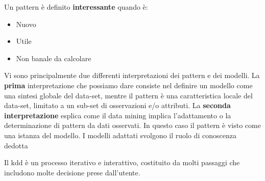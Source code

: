\documentclass[a4paper]{extarticle}
\begin{document}
Un pattern è definito \textbf{interessante} quando è:
\begin{itemize}
	\item Nuovo
	\item Utile
	\item Non banale da calcolare
\end{itemize}

Vi sono principalmente due differenti interpretazioni dei pattern e dei modelli.
La \textbf{prima} interpretazione che possiamo dare consiste nel definire un modello come una sintesi globale del data-set, mentre il pattern è una caratteristica locale del data-set, limitato a un sub-set di osservazioni e/o attributi.
La \textbf{seconda interpretazione} esplica come il data mining implica l'adattamento o la determinazione di pattern da dati osservati. In questo caso il pattern è visto come una istanza del modello. I modelli adattati svolgono il ruolo di conoscenza dedotta

Il kdd è un processo iterativo e interattivo, costituito da molti passaggi che includono molte decisione prese dall'utente.

\begin{figure}[ht]
\noindent
{}%
\end{figure}
\end{document}
